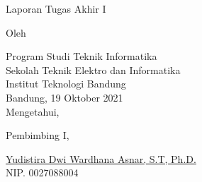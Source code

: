 \clearpage
\pagestyle{empty}

\begin{center}
    \smallskip
    
    \Large \bfseries \MakeUppercase{\thetitle}
    \vfill
    
    \Large Laporan Tugas Akhir I
    \vfill
    
    \large Oleh
    
    \Large \theauthor
    
    \large Program Studi Teknik Informatika \\
    
    \normalsize \normalfont
    Sekolah Teknik Elektro dan Informatika \\
    Institut Teknologi Bandung \\
    
    \vfill
    \normalsize \normalfont
    Bandung, 19 Oktober 2021 \\
    Mengetahui,
    
    \vspace{0.5cm}
    Pembimbing I,
    
    \vfill
    \underline{Yudistira Dwi Wardhana Asnar, S.T, Ph.D.} \\
    NIP. 0027088004
    
\end{center}
\clearpage
